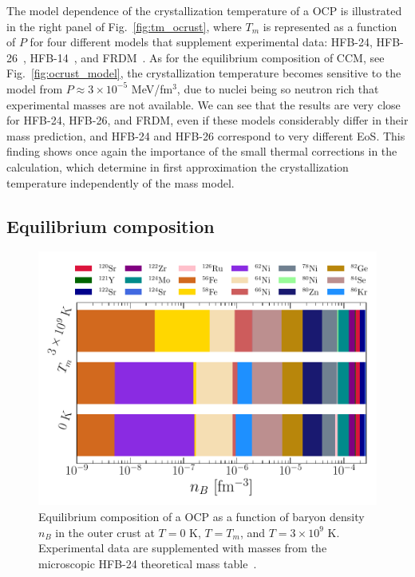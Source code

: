 The model dependence of the crystallization temperature of a OCP is illustrated 
in the right panel of Fig.~\ref{fig:tm_ocrust}, where $T_m$ is represented as a
function of $P$ for four different models that supplement experimental data:
HFB-24, HFB-26~\cite{Goriely2013}, HFB-14~\cite{Goriely2007}, and
FRDM~\cite{Moller1995}. 
As for the equilibrium composition of CCM, see Fig.~\ref{fig:ocrust_model}, the 
crystallization temperature becomes sensitive to the model from $P \approx 
3\times 10^{-5}$ MeV/fm$^{3}$, due to nuclei being so neutron rich that 
experimental masses are not available. We can see that the results are very
close for HFB-24, HFB-26, and FRDM, even if these models considerably differ in
their mass prediction, and HFB-24 and HFB-26 correspond to very different EoS.
This finding shows once again the importance of the small thermal corrections 
in the calculation, which determine in first approximation the crystallization
temperature independently of the mass model.

\subsection{Equilibrium composition}\label{subsec:compo_ocrust_tm}

\begin{figure}[!t]
  \begin{center}
    \includegraphics[width=\linewidth]{figures/ocrust_compo_vs_temp.pdf}
  \end{center}
  \caption[Equilibrium OCP composition versus baryon density in the outer crust 
  at finite temperature]{Equilibrium composition of a OCP as a function of 
    baryon density $n_B$ in the outer crust at $T=0$ \si{\kelvin}, $T=T_m$, and 
    $T=3\times 10^9$ \si{\kelvin}. 
  Experimental data are supplemented with masses from the microscopic HFB-24 
  theoretical mass table~\cite{Goriely2013}.}\label{fig:ocrust_compo_vs_temp}
\end{figure}

